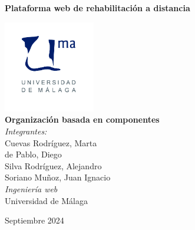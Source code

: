 \documentclass{article}
\begin{document}
	
	\begin{titlepage}
		\centering
		\vspace*{3cm}
		
		{\Huge \textbf{Plataforma web de rehabilitación a distancia}\\[0.5cm]}
		
		\vspace{2cm}
		\includegraphics[width=0.3\textwidth]{images/uma_logo.jpg}\\[1cm]
		
		{\LARGE \textbf{Organización basada en componentes}\\[0.5cm]}
		{\large \textit{Integrantes:}\\
			Cuevas Rodríguez, Marta\\
			de Pablo, Diego\\
			Silva Rodríguez, Alejandro\\
			Soriano Muñoz, Juan Ignacio\\
		}
		\vfill
		{\large \textit{Ingeniería web}\\
			Universidad de Málaga\\
		}
		
		\vfill
		
		{\large Septiembre 2024}
	\end{titlepage}
	
	\tableofcontents
	
	\newpage
	
\end{document}
